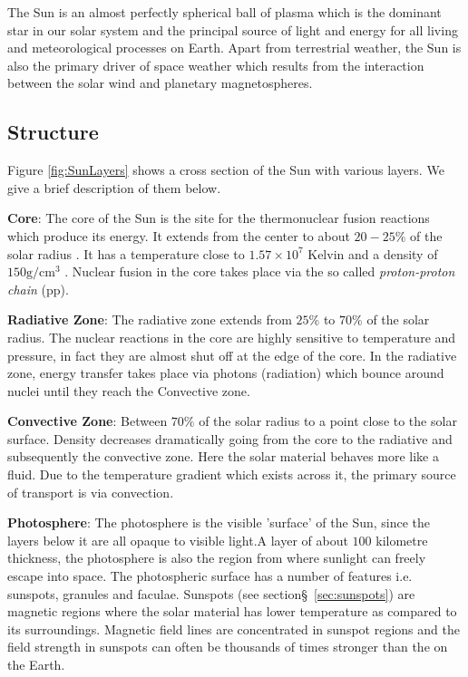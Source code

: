 The Sun is an almost perfectly spherical ball of plasma which is the dominant star in our solar system and 
the principal source of light and energy for all living and meteorological processes on Earth. Apart from 
terrestrial weather, the Sun is also the primary driver of space weather which results from the interaction 
between the solar wind and planetary magnetospheres.

\subsection{Structure}

Figure \ref{fig:SunLayers} shows a cross section of the Sun with various layers. We give a brief description 
of them below.

\textbf{Core}: The core of the Sun is the site for the thermonuclear fusion reactions which produce its energy. 
It extends from the center to about $20-25\%$ of the solar radius \citep{SolarAct}. It has a temperature close to 
$1.57 \times 10^7$ Kelvin and a density of $150 \text{g}/\text{cm}^3$ \citep{SolarCore}. Nuclear fusion in the core 
takes place via the so called \emph{proton-proton chain} (pp).

\textbf{Radiative Zone}: The radiative zone extends from $25\%$ to $70\%$ of the solar radius. The nuclear reactions 
in the core are highly sensitive to temperature and pressure, in fact they are almost shut off at the edge of the core. 
In the radiative zone, energy transfer takes place via photons (radiation) which bounce around nuclei until 
they reach the Convective zone.

\textbf{Convective Zone}: Between $70\%$ of the solar radius to a point close to the solar surface. Density decreases 
dramatically going from the core to the radiative and subsequently the convective zone. Here the solar material behaves more 
like a fluid. Due to the temperature gradient which exists across it, the primary source of transport is 
via convection.

\textbf{Photosphere}: The photosphere is the visible 'surface' of the Sun, since the layers below it are all opaque to 
visible light.A layer of about $100$ kilometre thickness, the photosphere is also the region from where sunlight can freely 
escape into space. The photospheric surface has a number of features i.e. sunspots, granules and faculae. 
Sunspots (see section\S~\ref{sec:sunspots}) are magnetic regions where the solar material has lower temperature as compared 
to its surroundings. Magnetic field lines are concentrated in sunspot regions and the field strength in sunspots can often 
be thousands of times stronger than the on the Earth.

